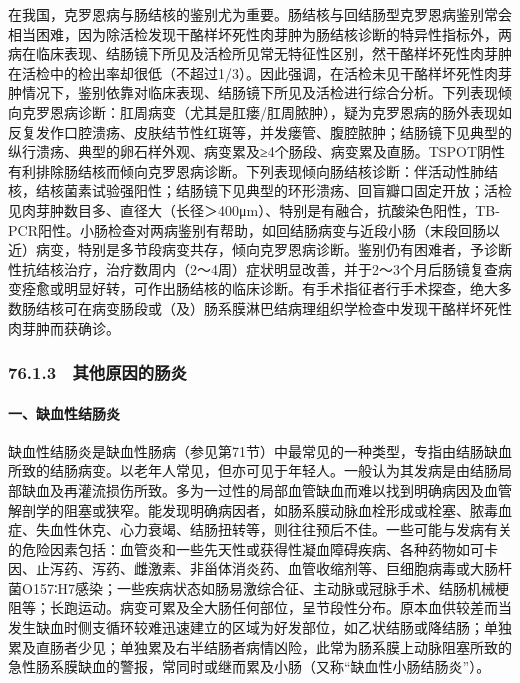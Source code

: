 在我国，克罗恩病与肠结核的鉴别尤为重要。肠结核与回结肠型克罗恩病鉴别常会相当困难，因为除活检发现干酪样坏死性肉芽肿为肠结核诊断的特异性指标外，两病在临床表现、结肠镜下所见及活检所见常无特征性区别，然干酪样坏死性肉芽肿在活检中的检出率却很低（不超过1/3）。因此强调，在活检未见干酪样坏死性肉芽肿情况下，鉴别依靠对临床表现、结肠镜下所见及活检进行综合分析。下列表现倾向克罗恩病诊断：肛周病变（尤其是肛瘘/肛周脓肿），疑为克罗恩病的肠外表现如反复发作口腔溃疡、皮肤结节性红斑等，并发瘘管、腹腔脓肿；结肠镜下见典型的纵行溃疡、典型的卵石样外观、病变累及≥4个肠段、病变累及直肠。TSPOT阴性有利排除肠结核而倾向克罗恩病诊断。下列表现倾向肠结核诊断：伴活动性肺结核，结核菌素试验强阳性；结肠镜下见典型的环形溃疡、回盲瓣口固定开放；活检见肉芽肿数目多、直径大（长径＞400μm）、特别是有融合，抗酸染色阳性，TB-PCR阳性。小肠检查对两病鉴别有帮助，如回结肠病变与近段小肠（末段回肠以近）病变，特别是多节段病变共存，倾向克罗恩病诊断。鉴别仍有困难者，予诊断性抗结核治疗，治疗数周内（2～4周）症状明显改善，并于2～3个月后肠镜复查病变痊愈或明显好转，可作出肠结核的临床诊断。有手术指征者行手术探查，绝大多数肠结核可在病变肠段或（及）肠系膜淋巴结病理组织学检查中发现干酪样坏死性肉芽肿而获确诊。

\subsubsection{76.1.3　其他原因的肠炎}

\paragraph{一、缺血性结肠炎}

缺血性结肠炎是缺血性肠病（参见第71节）中最常见的一种类型，专指由结肠缺血所致的结肠病变。以老年人常见，但亦可见于年轻人。一般认为其发病是由结肠局部缺血及再灌流损伤所致。多为一过性的局部血管缺血而难以找到明确病因及血管解剖学的阻塞或狭窄。能发现明确病因者，如肠系膜动脉血栓形成或栓塞、脓毒血症、失血性休克、心力衰竭、结肠扭转等，则往往预后不佳。一些可能与发病有关的危险因素包括：血管炎和一些先天性或获得性凝血障碍疾病、各种药物如可卡因、止泻药、泻药、雌激素、非甾体消炎药、血管收缩剂等、巨细胞病毒或大肠杆菌O157∶H7感染；一些疾病状态如肠易激综合征、主动脉或冠脉手术、结肠机械梗阻等；长跑运动。病变可累及全大肠任何部位，呈节段性分布。原本血供较差而当发生缺血时侧支循环较难迅速建立的区域为好发部位，如乙状结肠或降结肠；单独累及直肠者少见；单独累及右半结肠者病情凶险，此常为肠系膜上动脉阻塞所致的急性肠系膜缺血的警报，常同时或继而累及小肠（又称“缺血性小肠结肠炎”）。

